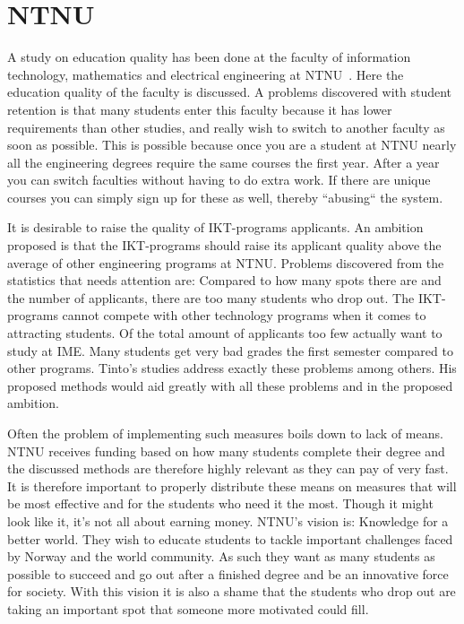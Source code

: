 \section{NTNU}
A study on education quality has been done at the faculty of information technology, mathematics and electrical engineering at NTNU~\cite{ntnu:dropout}. 
Here the education quality of the faculty is discussed. 
A problems discovered with student retention is that many students enter this faculty because it has lower requirements than other studies, and really wish to switch to another faculty as soon as possible. 
This is possible because once you are a student at NTNU nearly all the engineering degrees require the same courses the first year. 
After a year you can switch faculties without having to do extra work. 
If there are unique courses you can simply sign up for these as well, thereby ``abusing`` the system.

\bigskip\noindent
It is desirable to raise the quality of IKT-programs applicants. 
An ambition proposed is that the IKT-programs should raise its applicant quality above the average of other engineering programs at NTNU.
Problems discovered from the statistics that needs attention are:
Compared to how many spots there are and the number of applicants, there are too many students who drop out. 
The IKT-programs cannot compete with other technology programs when it comes to attracting students. 
Of the total amount of applicants too few actually want to study at IME.
Many students get very bad grades the first semester compared to other programs.
Tinto's studies address exactly these problems among others. His proposed methods would aid greatly with all these problems and in the proposed ambition.

\bigskip\noindent
Often the problem of implementing such measures boils down to lack of means.
NTNU receives funding based on how many students complete their degree and the discussed methods are therefore highly relevant as they can pay of very fast.
It is therefore important to properly distribute these means on measures that will be most effective and for the students who need it the most.
Though it might look like it, it's not all about earning money.
NTNU's vision is: Knowledge for a better world.
They wish to educate students to tackle important challenges faced by Norway and the world community.
As such they want as many students as possible to succeed and go out after a finished degree and be an innovative force for society. 
With this vision it is also a shame that the students who drop out are taking an important spot that someone more motivated could fill.

